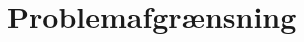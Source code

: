 

\raggedbottom



\frontmatter
%
%
%
%
%
%

\tableofcontents* 

\mainmatter

%
%
%
%
%
%
%
\chapter{Problemafgrænsning}\vspace{-.75cm}

